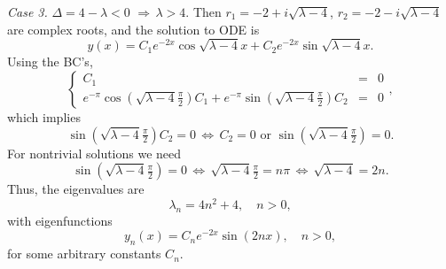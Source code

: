 \documentclass[11pt]{article}
\begin{document}
\begin{solution}
\par \textsl{Case 3.} $\Delta = 4-\lambda <0 \,\, \Rightarrow \, \lambda>4.$ Then $r_{1}=-2+i\sqrt{\lambda-4}$, $r_{2}=-2-i\sqrt{\lambda-4}$ are complex roots, and the solution to ODE is
\[y(x)=C_{1}e^{-2x}\cos\sqrt{\lambda-4}x+C_{2}e^{-2x}\sin\sqrt{\lambda-4}x.\]
Using the BC's,
\begin{equation*}
\left\{\begin{array}{rcl}
       C_{1}  & = & 0\\
       e^{-\pi}\cos(\sqrt{\lambda-4}\tfrac{\pi}{2})C_{1} + e^{-\pi}\sin(\sqrt{\lambda-4}\tfrac{\pi}{2})C_{2}&=&0
      \end{array}\right. ,
\end{equation*}
which implies 
\[\sin(\sqrt{\lambda-4}\tfrac{\pi}{2})C_{2}=0 \,\Leftrightarrow\, C_{2} = 0 \text{ or } \sin(\sqrt{\lambda-4}\tfrac{\pi}{2})=0.\]
For nontrivial solutions we need 
\[\sin(\sqrt{\lambda-4}\tfrac{\pi}{2})=0 \,\Leftrightarrow \, \sqrt{\lambda-4}\tfrac{\pi}{2}=n\pi \,\Leftrightarrow \, \sqrt{\lambda-4}=2n.\] 
Thus, the eigenvalues are
\[\boxed{\lambda_{n}=4n^{2}+4}, \quad n > 0,\]
with eigenfunctions
\[\boxed{y_{n}(x)=C_{n}e^{-2x}\sin(2nx)}, \quad n > 0,\]
for some arbitrary constants $C_{n}$.
\end{solution}
\end{document}
